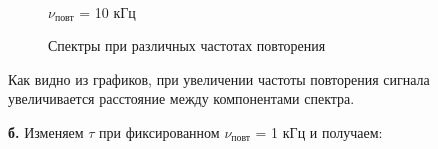 \documentclass[a4paper,12pt]{article}
\begin{document}
\begin{enumerate}
\begin{figure}[h]
\begin{minipage}[h]{0.47\linewidth}
\end{minipage}
\hfill
\begin{minipage}[h]{0.47\linewidth}
 \\ $\nu_\text{повт}$ = 10 кГц
\end{minipage}
\caption{Спектры при различных частотах повторения}
\label{ris:experimentalcorrelationsignals}
\end{figure}

Как видно из графиков, при увеличении частоты повторения сигнала увеличивается расстояние между компонентами спектра.

\newpage

\textbf{б.} Изменяем $\tau$ при фиксированном $\nu_\text{повт}$ = 1 кГц и получаем:


\end{enumerate}
\end{document}
